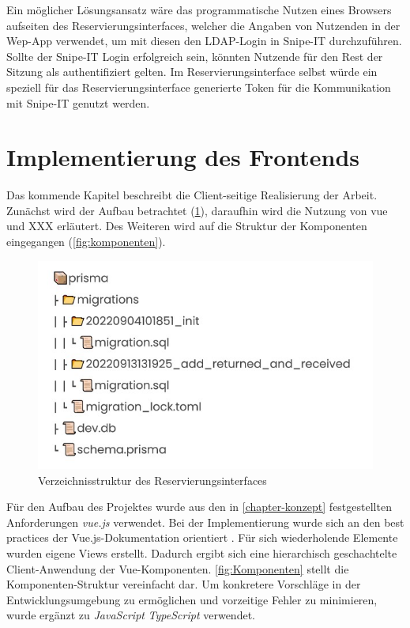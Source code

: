 Ein möglicher Lösungsansatz wäre das programmatische Nutzen eines Browsers aufseiten des
Reservierungsinterfaces, welcher die Angaben von Nutzenden in der Wep-App verwendet, um mit diesen
den LDAP-Login in Snipe-IT durchzuführen. Sollte der Snipe-IT Login erfolgreich sein, könnten
Nutzende für den Rest der Sitzung als authentifiziert gelten. Im Reservierungsinterface selbst
würde ein speziell für das Reservierungsinterface generierte Token für die Kommunikation mit
Snipe-IT genutzt werden. 


\section{Implementierung des Frontends}  Das kommende Kapitel beschreibt die Client-seitige
  Realisierung der Arbeit. Zunächst wird der Aufbau betrachtet (\ref{fig:vue}), daraufhin wird die
  Nutzung von vue und XXX erläutert. Des Weiteren wird auf die Struktur der Komponenten eingegangen
  (\ref{fig:komponenten}). 

\begin{figure}[h]
  \centering
  \includegraphics[scale=0.7]{Bilder/Db.jpg}
  \caption[Verzeichnisstruktur des Reservierungsinterfaces]{Verzeichnisstruktur des Reservierungsinterfaces}
  \label{fig:vue}
\end{figure}

Für den Aufbau des Projektes wurde aus den in \ref{chapter-konzept} festgestellten Anforderungen
\textit{vue.js} verwendet. Bei der Implementierung wurde sich an den best practices der
Vue.js-Dokumentation orientiert . Für sich wiederholende Elemente wurden
eigene Views erstellt. Dadurch ergibt sich eine hierarchisch geschachtelte Client-Anwendung der
Vue-Komponenten. \ref{fig:Komponenten} stellt die Komponenten-Struktur vereinfacht dar. Um
konkretere Vorschläge in der Entwicklungsumgebung zu ermöglichen und vorzeitige Fehler zu
minimieren, wurde ergänzt zu \textit{JavaScript} \textit{TypeScript} verwendet.

